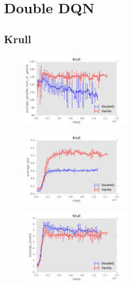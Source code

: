 \documentclass{sig-alternate}
\begin{document}


\appendix
\section{Double DQN}\label{Appendix Double DQN}

\subsection{Krull}\label{Appendix krull}

\begin{figure}[h!]
    \centering
    \includegraphics[width=0.5\textwidth]{../results/Krull/Comparisons/DoubleQ/DoubleQ-baseline-average_episode_num_of_games.pdf}
\end{figure}


\begin{figure}
    \centering
    \includegraphics[width=0.5\textwidth]{../results/Krull/Comparisons/DoubleQ/DoubleQ-baseline-average_loss.pdf}
\end{figure}


\begin{figure}[h!]
    \centering
    \includegraphics[width=0.5\textwidth]{../results/Krull/Comparisons/DoubleQ/DoubleQ-baseline-average_reward.pdf}
\end{figure}
\end{document}

